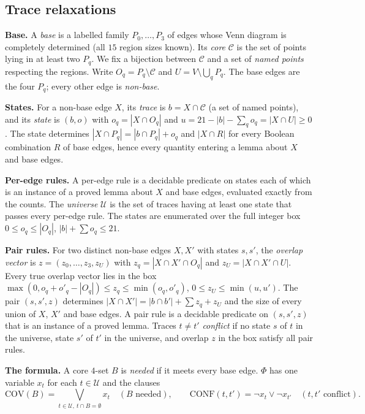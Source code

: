 \documentclass[11pt]{amsart}
\theoremstyle{definition}
\newcommand{\cU}{\mathcal{U}}
\newcommand{\Cov}{\mathrm{COV}}
\newcommand{\Conf}{\mathrm{CONF}}
\begin{document}
\subsection{Trace relaxations}\label{sec:tracerelax}
\textbf{Base.} A \emph{base} is a labelled family $P_0,\dots,P_3$ of edges whose Venn diagram is completely determined (all $15$ region sizes known). Its \emph{core} $\mathcal C$ is the set of points lying in at least two $P_q$. We fix a bijection between $\mathcal C$ and a set of \emph{named points} respecting the regions. Write $O_q=P_q\setminus\mathcal C$ and $U=V\setminus\bigcup_q P_q$. The base edges are the four $P_q$; every other edge is \emph{non-base}.

\textbf{States.} For a non-base edge $X$, its \emph{trace} is $b=X\cap\mathcal C$ (a set of named points), and its \emph{state} is $(b,o)$ with $o_q=|X\cap O_q|$ and $u=21-|b|-\sum_q o_q=|X\cap U|\ge0$. The state determines $|X\cap P_q|=|b\cap P_q|+o_q$ and $|X\cap R|$ for every Boolean combination $R$ of base edges, hence every quantity entering a lemma about $X$ and base edges.

\textbf{Per-edge rules.} A per-edge rule is a decidable predicate on states each of which is an instance of a proved lemma about $X$ and base edges, evaluated exactly from the counts. The \emph{universe} $\cU$ is the set of traces having at least one state that passes every per-edge rule. The states are enumerated over the full integer box $0\le o_q\le|O_q|$, $|b|+\sum o_q\le21$.

\textbf{Pair rules.} For two distinct non-base edges $X,X'$ with states $s,s'$, the \emph{overlap vector} is $z=(z_0,\dots,z_3,z_U)$ with $z_q=|X\cap X'\cap O_q|$ and $z_U=|X\cap X'\cap U|$. Every true overlap vector lies in the box $\max(0,o_q+o'_q-|O_q|)\le z_q\le\min(o_q,o'_q)$, $0\le z_U\le\min(u,u')$. The pair $(s,s',z)$ determines $|X\cap X'|=|b\cap b'|+\sum z_q+z_U$ and the size of every union of $X$, $X'$ and base edges. A pair rule is a decidable predicate on $(s,s',z)$ that is an instance of a proved lemma. Traces $t\ne t'$ \emph{conflict} if no state $s$ of $t$ in the universe, state $s'$ of $t'$ in the universe, and overlap $z$ in the box satisfy all pair rules.

\textbf{The formula.} A core $4$-set $B$ is \emph{needed} if it meets every base edge. $\Phi$ has one variable $x_t$ for each $t\in\cU$ and the clauses
\[\Cov(B)=\bigvee_{t\in\cU,\ t\cap B=\emptyset}x_t\quad(B\text{ needed}),\qquad \Conf(t,t')=\neg x_t\vee\neg x_{t'}\quad(t,t'\text{ conflict}).\]
\end{document}
